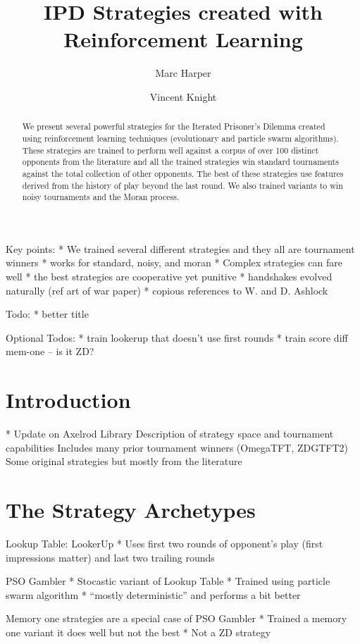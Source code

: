 \documentclass{article}
\title{IPD Strategies created with Reinforcement Learning}
\author{Marc Harper \and Vincent Knight} %
\date{}
\begin{document}
\maketitle

Key points:
* We trained several different strategies and they all are tournament
winners
* works for standard, noisy, and moran
* Complex strategies can fare well
* the best strategies are cooperative yet punitive
* handshakes evolved naturally (ref art of war paper)
* copious references to W. and D. Ashlock

Todo:
* better title

Optional Todos:
* train lookerup that doesn't use first rounds
* train score diff mem-one -- is it ZD?


\begin{abstract}
    We present several powerful strategies for the Iterated
    Prisoner's Dilemma created using reinforcement learning techniques
    (evolutionary and particle swarm algorithms). These strategies are
    trained to perform well against a corpus of over 100 distinct
    opponents from the literature and all the trained strategies
    win standard tournaments against the total collection of other opponents.
    The best of these strategies use features derived from the history
    of play beyond the last round. We also trained variants to win
    noisy tournaments and the Moran process.
\end{abstract} 

\section{Introduction}\label{sec:introduction}

* Update on Axelrod Library
Description of strategy space and tournament capabilities
Includes many prior tournament winners (OmegaTFT, ZDGTFT2)
Some original strategies but mostly from the literature

\section{The Strategy Archetypes}

Lookup Table: LookerUp
* Uses first two rounds of opponent's play (first impressions matter)
and last two trailing rounds


PSO Gambler
* Stocastic variant of Lookup Table
* Trained using particle swarm algorithm
* ``mostly deterministic'' and performs a bit better

Memory one strategies are a special case of PSO Gambler
* Trained a memory one variant it does well but not the best
* Not a ZD strategy
\end{document}
